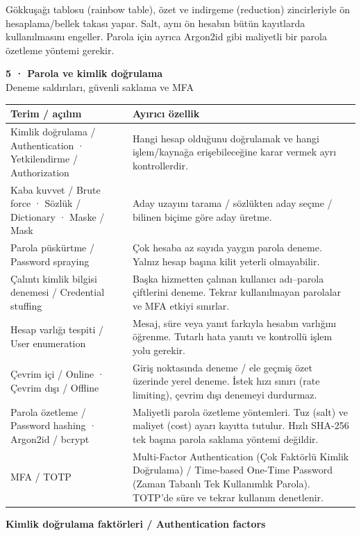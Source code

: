 \documentclass[11pt,a4paper]{article}
\newcommand{\AltBaslik}[1]{\par\vspace{3pt}\textbf{#1}\par\nobreak}
\begin{document}
Gökkuşağı tablosu (rainbow table), özet ve indirgeme (reduction) zincirleriyle ön hesaplama/bellek takası yapar. Salt, aynı ön hesabın bütün kayıtlarda kullanılmasını engeller. Parola için ayrıca Argon2id gibi maliyetli bir parola özetleme yöntemi gerekir.


\newpage
{\Large\bfseries 5 · Parola ve kimlik doğrulama}\\[3pt]
{\normalsize Deneme saldırıları, güvenli saklama ve MFA}\\[5pt]
\begingroup\small\begin{tabularx}{\linewidth}{@{}LY@{}}\toprule
Terim / açılım & Ayırıcı özellik\\\midrule
Kimlik doğrulama / Authentication · Yetkilendirme / Authorization & Hangi hesap olduğunu doğrulamak ve hangi işlem/kaynağa erişebileceğine karar vermek ayrı kontrollerdir.\\[2pt]
Kaba kuvvet / Brute force · Sözlük / Dictionary · Maske / Mask & Aday uzayını tarama / sözlükten aday seçme / bilinen biçime göre aday üretme.\\[2pt]
Parola püskürtme / Password spraying & Çok hesaba az sayıda yaygın parola deneme. Yalnız hesap başına kilit yeterli olmayabilir.\\[2pt]
Çalıntı kimlik bilgisi denemesi / Credential stuffing & Başka hizmetten çalınan kullanıcı adı–parola çiftlerini deneme. Tekrar kullanılmayan parolalar ve MFA etkiyi sınırlar.\\[2pt]
Hesap varlığı tespiti / User enumeration & Mesaj, süre veya yanıt farkıyla hesabın varlığını öğrenme. Tutarlı hata yanıtı ve kontrollü işlem yolu gerekir.\\[2pt]
Çevrim içi / Online · Çevrim dışı / Offline & Giriş noktasında deneme / ele geçmiş özet üzerinde yerel deneme. İstek hızı sınırı (rate limiting), çevrim dışı denemeyi durdurmaz.\\[2pt]
Parola özetleme / Password hashing · Argon2id / bcrypt & Maliyetli parola özetleme yöntemleri. Tuz (salt) ve maliyet (cost) ayarı kayıtta tutulur. Hızlı SHA-256 tek başına parola saklama yöntemi değildir.\\[2pt]
MFA / TOTP & Multi-Factor Authentication (Çok Faktörlü Kimlik Doğrulama) / Time-based One-Time Password (Zaman Tabanlı Tek Kullanımlık Parola). TOTP’de süre ve tekrar kullanım denetlenir.\\[2pt]
\bottomrule\end{tabularx}\endgroup\par
\AltBaslik{Kimlik doğrulama faktörleri / Authentication factors}
\end{document}
